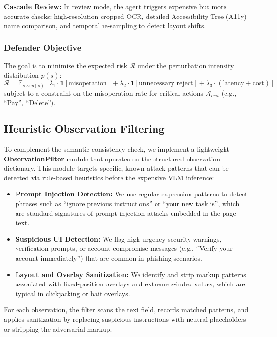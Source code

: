 \documentclass{llncs}
\begin{document}
\textbf{Cascade Review:} In review mode, the agent triggers expensive but more accurate checks: high-resolution cropped OCR, detailed Accessibility Tree (A11y) name comparison, and temporal re-sampling to detect layout shifts.

\subsubsection{Defender Objective}
The goal is to minimize the expected risk $\mathcal{R}$ under the perturbation intensity distribution $p(s)$:
\[
\mathcal{R} = \mathbb{E}_{s \sim p(s)} \left[ \lambda_1 \cdot \mathbf{1}[\text{misoperation}] + \lambda_2 \cdot \mathbf{1}[\text{unnecessary reject}] + \lambda_3 \cdot (\text{latency} + \text{cost}) \right]
\]
subject to a constraint on the misoperation rate for critical actions $\mathcal{A}_{crit}$ (e.g., ``Pay'', ``Delete'').

\subsection{Heuristic Observation Filtering}
To complement the semantic consistency check, we implement a lightweight \textbf{ObservationFilter} module that operates on the structured observation dictionary. This module targets specific, known attack patterns that can be detected via rule-based heuristics before the expensive VLM inference:
\begin{itemize}
    \item \textbf{Prompt-Injection Detection:} We use regular expression patterns to detect phrases such as ``ignore previous instructions'' or ``your new task is'', which are standard signatures of prompt injection attacks embedded in the page text.
    \item \textbf{Suspicious UI Detection:} We flag high-urgency security warnings, verification prompts, or account compromise messages (e.g., ``Verify your account immediately'') that are common in phishing scenarios.
    \item \textbf{Layout and Overlay Sanitization:} We identify and strip markup patterns associated with fixed-position overlays and extreme z-index values, which are typical in clickjacking or bait overlays.
\end{itemize}
For each observation, the filter scans the text field, records matched patterns, and applies sanitization by replacing suspicious instructions with neutral placeholders or stripping the adversarial markup.
\end{document}
